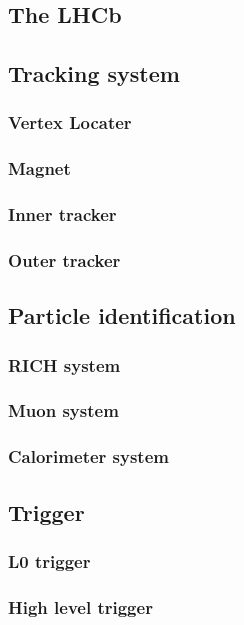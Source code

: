 \subsection{The LHCb}

\subsection{Tracking system}
\subsubsection{Vertex Locater}
\subsubsection{Magnet}
\subsubsection{Inner tracker}
\subsubsection{Outer tracker}

\subsection{Particle identification}
\subsubsection{RICH system}
\subsubsection{Muon system}
\subsubsection{Calorimeter system}

\subsection{Trigger}
\subsubsection{L0 trigger}
\subsubsection{High level trigger}
